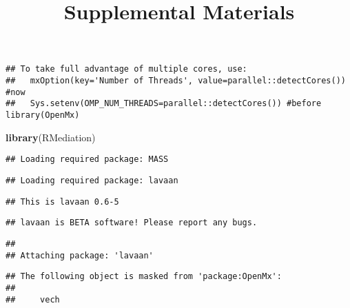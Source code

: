 \documentclass[11pt,]{article}
\title{Supplemental Materials}
\author{}
\date{}
\newenvironment{Shaded}{\begin{snugshade}}{\end{snugshade}}
\newcommand{\DataTypeTok}[1]{\textcolor[rgb]{0.13,0.29,0.53}{#1}}
\newcommand{\KeywordTok}[1]{\textcolor[rgb]{0.13,0.29,0.53}{\textbf{#1}}}
\newcommand{\NormalTok}[1]{#1}
\newcommand{\OperatorTok}[1]{\textcolor[rgb]{0.81,0.36,0.00}{\textbf{#1}}}
\newcommand{\OtherTok}[1]{\textcolor[rgb]{0.56,0.35,0.01}{#1}}
\begin{document}
\maketitle

\begin{Shaded}
\end{Shaded}

\begin{verbatim}
## To take full advantage of multiple cores, use:
##   mxOption(key='Number of Threads', value=parallel::detectCores()) #now
##   Sys.setenv(OMP_NUM_THREADS=parallel::detectCores()) #before library(OpenMx)
\end{verbatim}

\begin{Shaded}
\begin{Highlighting}[]
\KeywordTok{library}\NormalTok{(RMediation)}
\end{Highlighting}
\end{Shaded}

\begin{verbatim}
## Loading required package: MASS
\end{verbatim}

\begin{verbatim}
## Loading required package: lavaan
\end{verbatim}

\begin{verbatim}
## This is lavaan 0.6-5
\end{verbatim}

\begin{verbatim}
## lavaan is BETA software! Please report any bugs.
\end{verbatim}

\begin{verbatim}
## 
## Attaching package: 'lavaan'
\end{verbatim}

\begin{verbatim}
## The following object is masked from 'package:OpenMx':
## 
##     vech
\end{verbatim}
\end{document}
